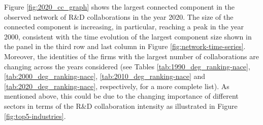 Figure %
\ref{fig:2020_cc_graph} 
shows the largest connected component in the observed network of R\&D
collaborations in the year %
2020.
The size of the connected component is increasing, in particular, reaching a peak in the year 2000, consistent with the time evolution of the largest component size shown in the panel in the third row and last column in Figure \ref{fig:network-time-series}. Moreover, the identities of the firms with the largest number of collaborations are changing across the years considered (see Tables \ref{tab:1990_deg_ranking-nace}, \ref{tab:2000_deg_ranking-nace}, \ref{tab:2010_deg_ranking-nace} and \ref{tab:2020_deg_ranking-nace}, respectively, for a more complete list). As mentioned above, this could be due to the changing importance of different sectors in terms of the R\&D collaboration intensity as illustrated in Figure \ref{fig:top5-industries}.



